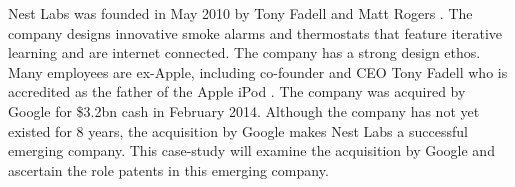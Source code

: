 {}

Nest Labs was founded in May 2010 by Tony Fadell and Matt Rogers \cite{nestcompany}.
The company designs innovative smoke alarms and thermostats that feature iterative learning and are internet connected.
The company has a strong design ethos.
Many employees are ex-Apple, including co-founder and CEO Tony Fadell who is accredited as the father of the Apple iPod \cite{reuters}.
The company was acquired by Google for \$3.2bn cash \cite{reuters} in February 2014.
Although the company has not yet existed for 8 years, the acquisition by Google makes Nest Labs a successful emerging company.
This case-study will examine the acquisition by Google and ascertain the role patents in this emerging company.

